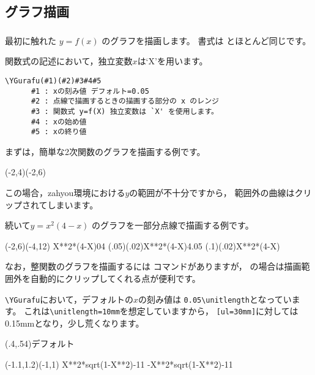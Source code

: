 \subsection{グラフ描画}
\subsubsection{}
最初に触れた $y=f(x)$ のグラフを描画します。
書式は  とほとんど同じです。

関数式の記述において，独立変数$x$は`X'を用います。

\begin{boxnote}
\begin{verbatim}
\YGurafu(#1)(#2)#3#4#5
      #1 : xの刻み値 デフォルト=0.05
      #2 : 点線で描画するときの描画する部分の x のレンジ
      #3 : 関数式 y=f(X) 独立変数は `X' を使用します。
      #4 : xの始め値
      #5 : xの終り値
\end{verbatim}
\end{boxnote}

まずは，簡単な2次関数のグラフを描画する例です。

\begin{showEx}{}
\small
\begin{zahyou}(-2,4)(-2,6)
\end{zahyou}
\end{showEx}

この場合，\textsf{zahyou}環境における$y$の範囲が不十分ですから，
範囲外の曲線はクリップされてしまいます。

続いて$y=x^2(4-x)$ のグラフを一部分点線で描画する例です。

\begin{showEx}{}
\small
\begin{zahyou}(-2,6)(-4,12)
\def\Fx{X**2*(4-X)}
\YGurafu\Fx{0}{4}
\YGurafu(.05)(.02)\Fx{4.05}\xmax
\YGurafu(.1)(.02)\Fx{}
\end{zahyou}
\end{showEx}

なお，整関数のグラフを描画するには  コマンドがありますが，
 の場合は描画範囲外を自動的にクリップしてくれる点が便利です。

\verb+\YGurafu+において，デフォルトの$x$の刻み値は
\verb+0.05\unitlength+となっています。
これは\verb+\unitlength=10mm+を想定していますから，
\verb+[ul=30mm]+に対しては0.15mmとなり，少し荒くなります。

\begin{showEx}(.4,.54){デフォルト}
\begin{zahyou}[ul=30mm]
  (-1.1,1.2)(-1,1)%
\def\Fx{X**2*sqrt(1-X**2)}%
\def\Gx{-X**2*sqrt(1-X**2)}%
\YGurafu\Fx{-1}{1}
\YGurafu\Gx{-1}{1}
\end{zahyou}
\end{showEx}

